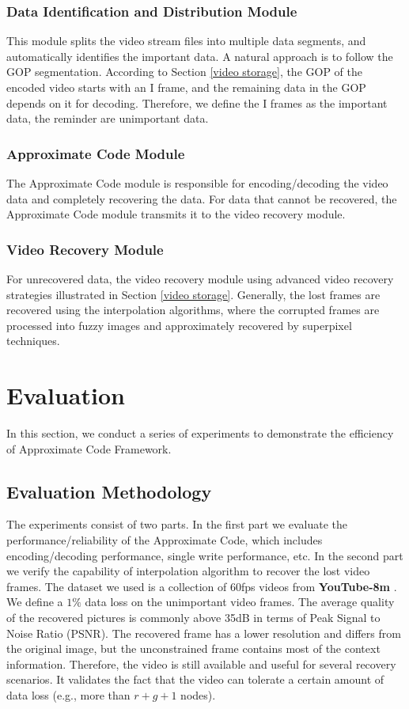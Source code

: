 \documentclass[sigconf]{acmart}
\begin{document}
\subsubsection{Data Identification and Distribution Module}
This module splits the video stream files into multiple data segments, and automatically identifies the important data. A natural approach is to follow the GOP segmentation. According to Section \ref{video storage}, the GOP of the encoded video starts with an I frame, and the remaining data in the GOP depends on it for decoding. Therefore, we define the I frames as the important data, the reminder are unimportant data.

\subsubsection{Approximate Code Module}
The Approximate Code module is responsible for encoding/decoding the video data and completely recovering the data. For data that cannot be recovered, the Approximate Code module transmits it to the video recovery module.

\subsubsection{Video Recovery Module}
For unrecovered data, the video recovery module using advanced video recovery strategies illustrated in Section \ref{video storage}. Generally, the lost frames are recovered using the interpolation algorithms, where the corrupted frames are processed into fuzzy images and approximately recovered by superpixel techniques.


\section{Evaluation}\label{evaluation}
In this section, we conduct a series of experiments to demonstrate the efficiency of Approximate Code Framework.


\subsection{Evaluation Methodology}
The experiments consist of two parts. In the first part we evaluate the performance/reliability of the Approximate Code, which includes encoding/decoding performance, single write performance, etc. In the second part we verify the capability of interpolation algorithm\cite{meyer2015phase, niklaus2018context,van2017frame} to recover the lost video frames. The dataset we used is a collection of 60fps videos from \textbf{YouTube-8m} \cite{youtube8m}. We define a $1\%$ data loss on the unimportant video frames.
The average quality of the recovered pictures is commonly above 35dB in terms of Peak Signal to Noise Ratio (PSNR).  The recovered frame has a lower resolution and differs from the original image, but the unconstrained frame contains most of the context information. Therefore, the video is still available and useful for several recovery scenarios. It validates the fact that the video can tolerate a certain amount of data loss (e.g., more than $r+g+1$ nodes).
\end{document}

